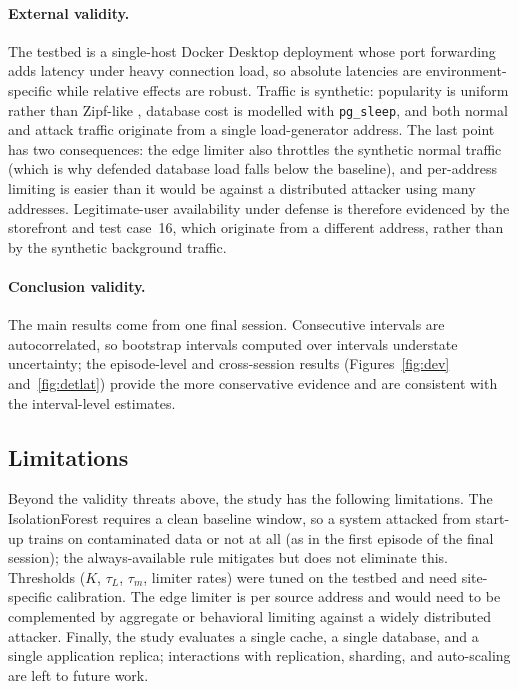 \paragraph{External validity.} The testbed is a single-host Docker Desktop deployment
whose port forwarding adds latency under heavy connection load, so absolute latencies
are environment-specific while relative effects are robust. Traffic is synthetic:
popularity is uniform rather than Zipf-like \cite{breslau1999}, database cost is
modelled with \texttt{pg\_sleep}, and both normal and attack traffic originate from a
single load-generator address. The last point has two consequences: the edge limiter
also throttles the synthetic normal traffic (which is why defended database load falls
below the baseline), and per-address limiting is easier than it would be against a
distributed attacker using many addresses. Legitimate-user availability under defense
is therefore evidenced by the storefront and test case~16, which originate from a
different address, rather than by the synthetic background traffic.

\paragraph{Conclusion validity.} The main results come from one final session.
Consecutive intervals are autocorrelated, so bootstrap intervals computed over
intervals understate uncertainty; the episode-level and cross-session results
(Figures~\ref{fig:dev} and~\ref{fig:detlat}) provide the more conservative evidence and
are consistent with the interval-level estimates.

\subsection{Limitations}
\label{sec:limitations}
Beyond the validity threats above, the study has the following limitations. The
IsolationForest requires a clean baseline window, so a system attacked from start-up
trains on contaminated data or not at all (as in the first episode of the final
session); the always-available rule mitigates but does not eliminate this. Thresholds
($K$, $\tau_L$, $\tau_m$, limiter rates) were tuned on the testbed and need site-specific
calibration. The edge limiter is per source address and would need to be complemented
by aggregate or behavioral limiting against a widely distributed attacker. Finally, the
study evaluates a single cache, a single database, and a single application replica;
interactions with replication, sharding, and auto-scaling are left to future work.
